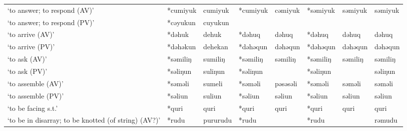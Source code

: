 \begin{landscape}
\begin{longtable}[c]{@{}p{3cm}<{\raggedright}p{2.75cm}<{\raggedright}p{2.75cm}<{\raggedright}p{2.75cm}<{\raggedright}p{2.75cm}<{\raggedright}p{2.75cm}<{\raggedright}p{2.75cm}<{\raggedright}p{2.75cm}<{\raggedright}@{}}
`to answer; to respond (AV)'                         & *cumiyuk           & cumiyuk                        & *cumiyuk           & cəmiyuk                    & *səmiyuk         & səmiyuk                  & səmiyuk                           \\
`to answer; to respond (PV)'                         & *cəyukun           & cuyukun                        &                    &                            &                  &                          &                                   \\
`to arrive (AV)'                                     & *dəhuk             & dehuk                          & *dəhuq             & dəhuq                      & *dəhuq           & dəhuq                    & dəhuq                             \\
`to arrive (PV)'                                     & *dəhəkun           & dehekan                        & *dəhəqun           & dəhəqun                    & *dəhəqun         & dəhəqun                  & dəhəqun                           \\
`to ask (AV)'                                        & *səmiliŋ           & sumiliŋ                        & *səmiliŋ           & səmiliŋ                    & *səmiliŋ         & səmiliŋ                  & səmiliŋ                           \\
`to ask (PV)'                                        & *səliŋun           & suliŋun                        & *səliŋun           &                            & *səliŋun         &                          & səliŋun                           \\
`to assemble (AV)'                                   & *səməli            & sumeli                         & *səməli            & pəsəsəli                   & *səməli          & səməli                   & səməli                            \\
`to assemble (PV)'                                   & *səliun            & suliun                         & *səliun            & səliun                     & *səliun          & səliun                   & səliun                            \\
`to be facing s.t.'                                  & *quri              & quri                           & *quri              & quri                       & *quri            & quri                     & quri                              \\
`to be in disarray; to be knotted (of string) (AV?)' & *rudu              & pururudu                       & *rudu              &                            & *rudu            &                          & rəmudu                            \\

\end{longtable}
\end{landscape}
